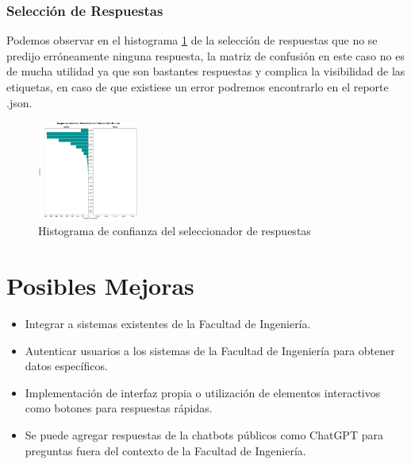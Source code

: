 \subsubsection{Selección de Respuestas}
Podemos observar en el histograma \ref{fig:response_histograma} de la selección de respuestas que
no se predijo erróneamente ninguna respuesta, la matriz de confusión en este caso no es de mucha
utilidad ya que son bastantes respuestas y complica la visibilidad de las etiquetas, en caso de que
existiese un error podremos encontrarlo en el reporte .json.

\begin{figure}[H]
	\centering
	\includegraphics[angle=0,width=0.3\textwidth]{Figuras/response_selection_histogram.png}
	\caption{Histograma de confianza del seleccionador de respuestas}
	\label{fig:response_histograma}
\end{figure}
\section{Posibles Mejoras}
\begin{itemize}
	\item Integrar a sistemas existentes de la Facultad de Ingeniería.
	\item Autenticar usuarios a los sistemas de la Facultad de Ingeniería para obtener datos
	      específicos.
	\item Implementación de interfaz propia o utilización de elementos interactivos como
	      botones
	      para respuestas rápidas.
	\item Se puede agregar respuestas de la chatbots públicos como	ChatGPT \cite{api_chatgpt}
	      para preguntas
	      fuera del
	      contexto de la Facultad de Ingeniería.
\end{itemize}
